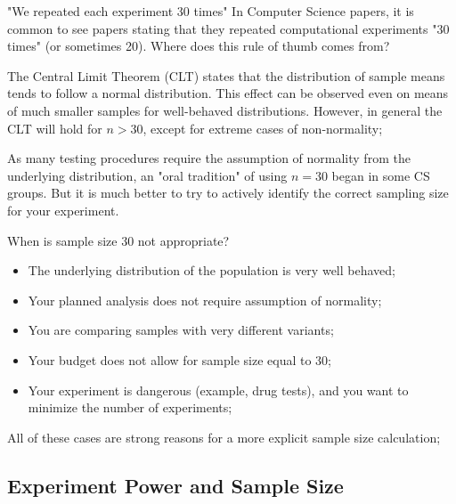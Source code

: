 \begin{frame}{"We repeated each experiment 30 times"}
  In Computer Science papers, it is common to see papers stating that they repeated computational experiments "30 times" (or sometimes 20). Where does this rule of thumb comes from?\bigskip

  The Central Limit Theorem (CLT) states that the distribution of sample means tends to follow a normal distribution. This effect can be observed even on means of much smaller samples for well-behaved distributions. However, in general the CLT will hold for $n > 30$, except for extreme cases of non-normality;\bigskip

  As many testing procedures require the assumption of normality from the underlying distribution, an "oral tradition" of using $n=30$ began in some CS groups. But it is much better to try to actively identify the correct sampling size for your experiment.
\end{frame}

\begin{frame}{When is sample size 30 not appropriate?}
  \begin{itemize}
    \item The underlying distribution of the population is very well behaved;
    \item Your planned analysis does not require assumption of normality; \bigskip

    \item You are comparing samples with very different variants; \bigskip

    \item Your budget does not allow for sample size equal to 30;
    \item Your experiment is dangerous (example, drug tests), and you want to minimize the number of experiments;
  \end{itemize}\bigskip

  All of these cases are strong reasons for a more explicit sample size calculation;
\end{frame}

\subsection{Experiment Power and Sample Size}

